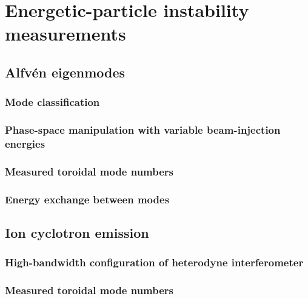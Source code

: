 \chapter{Energetic-particle instability measurements}


\section{Alfv\'{e}n eigenmodes}
\subsection{Mode classification}
\subsection{Phase-space manipulation with variable beam-injection energies}
\subsection{Measured toroidal mode numbers}
\subsection{Energy exchange between modes}


\section{Ion cyclotron emission}
\subsection{High-bandwidth configuration of heterodyne interferometer}
\subsection{Measured toroidal mode numbers}
